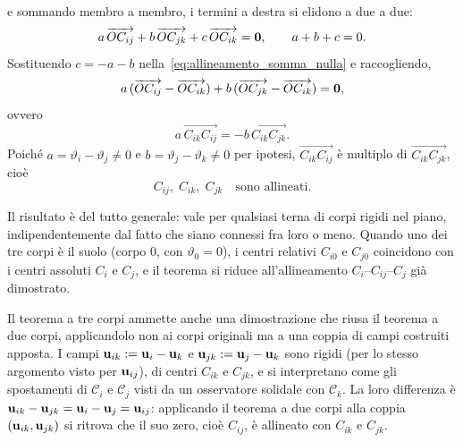 e sommando membro a membro, i termini a destra si elidono a due a due:
\begin{equation}\label{eq:allineamento_somma_nulla}
	a\,\overrightarrow{OC_{ij}} + b\,\overrightarrow{OC_{jk}} + c\,\overrightarrow{OC_{ik}} = \mathbf{0},
	\qquad a+b+c=0.
\end{equation}
Sostituendo $c=-a-b$ nella~\eqref{eq:allineamento_somma_nulla} e raccogliendo,
\begin{equation}
	a\,(\overrightarrow{OC_{ij}}-\overrightarrow{OC_{ik}})
	+ b\,(\overrightarrow{OC_{jk}}-\overrightarrow{OC_{ik}}) = \mathbf{0},
	\end{equation}
ovvero
\begin{equation}
		a\,\overrightarrow{C_{ik}C_{ij}} = -b\,\overrightarrow{C_{ik}C_{jk}}.
\end{equation}
Poiché $a=\vartheta_i-\vartheta_j\neq 0$ e $b=\vartheta_j-\vartheta_k\neq 0$ per ipotesi, 
$\overrightarrow{C_{ik}C_{ij}}$ è  multiplo di $\overrightarrow{C_{ik}C_{jk}}$,
cioè
\begin{equation}
	C_{ij},\; C_{ik},\; C_{jk} \quad \text{sono allineati.}
\end{equation}





\begin{oss}
	Il risultato è del tutto generale: vale per qualsiasi terna di corpi rigidi nel
	piano, indipendentemente dal fatto che siano connessi fra loro o meno. Quando
	uno dei tre corpi è il suolo (corpo $0$, con $\vartheta_0 = 0$), i centri
	relativi $C_{i0}$ e $C_{j0}$ coincidono con i centri assoluti $C_i$ e $C_j$, e il
	teorema si riduce all'allineamento $C_i$--$C_{ij}$--$C_j$ già dimostrato.
\end{oss}

\begin{oss}
	Il teorema a tre corpi ammette anche una dimostrazione che riusa il teorema a
	due corpi, applicandolo non ai corpi originali ma a una coppia di campi
	costruiti apposta. I campi $\mathbf{u}_{ik}:=\mathbf{u}_i-\mathbf{u}_k$ e $\mathbf{u}_{jk}:=\mathbf{u}_j-\mathbf{u}_k$
	sono rigidi (per lo stesso argomento visto per $\mathbf{u}_{ij}$), di centri $C_{ik}$
	e $C_{jk}$, e si interpretano come gli spostamenti di $\mathcal{C}_i$ e
	$\mathcal{C}_j$ visti da un osservatore solidale con $\mathcal{C}_k$. La loro
	differenza è $\mathbf{u}_{ik}-\mathbf{u}_{jk}=\mathbf{u}_i-\mathbf{u}_j=\mathbf{u}_{ij}$: applicando il teorema a
	due corpi alla coppia $(\mathbf{u}_{ik},\mathbf{u}_{jk})$ si ritrova che il suo zero, cioè
	$C_{ij}$, è allineato con $C_{ik}$ e $C_{jk}$.
\end{oss}


